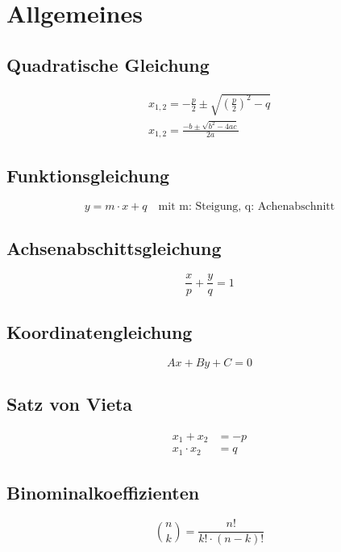
%
%

\section{Allgemeines}

\subsection{Quadratische Gleichung}
\begin{gather}
  x_{1,2} = -\frac{p}{2}\pm\sqrt{{\left(\frac{p}{2}\right)}^2-q} \\
  x_{1,2} = \frac{-b\pm\sqrt{b^2-4ac}}{2a}
\end{gather}

\subsection{Funktionsgleichung}
\begin{equation}
  y = m\cdot x+q \quad \text{mit m: Steigung, q: Achenabschnitt}
\end{equation}

\subsection{Achsenabschittsgleichung}
\begin{equation}
\frac{x}{p}+\frac{y}{q} = 1
\end{equation}

\subsection{Koordinatengleichung}
\begin{equation}
  Ax+By+C = 0
\end{equation}

\subsection{Satz von Vieta}
\begin{align}
  x_1 + x_2 &= -p \\
  x_1 \cdot x_2 &= q
\end{align}

\subsection{Binominalkoeffizienten}
\begin{equation}
  \binom{n}{k} = \frac{n!}{k!\cdot{\left(n-k\right)}!}
\end{equation}


